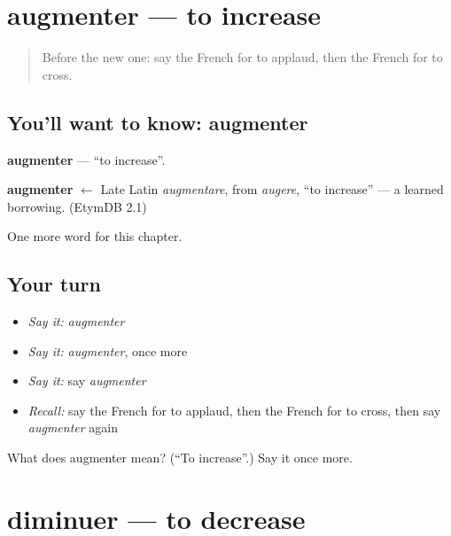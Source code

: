 \section[augmenter]{augmenter — to increase}

\label{lesson:FR-C208-augmenter}



\begin{quote}
Before the new one: say the French for to applaud, then the French for to cross.
\end{quote}

\subsection*{You'll want to know: augmenter}
\textbf{augmenter} — \textquotedblleft{}to increase\textquotedblright{}.

\begin{cousinweb}
\textbf{augmenter} $\leftarrow$ Late Latin \emph{augmentare}, from \emph{augere}, \textquotedblleft{}to increase\textquotedblright{} — a learned borrowing. (EtymDB 2.1)
\end{cousinweb}

\begin{grammarlens}[title={What you've built}]
One more word for this chapter.
\end{grammarlens}

\subsection*{Your turn}
\begin{itemize}
\raggedright
  \item \emph{Say it:} \emph{augmenter}
  \item \emph{Say it:} \emph{augmenter}, once more
  \item \emph{Say it:} say \emph{augmenter}
  \item \emph{Recall:} say the French for to applaud, then the French for to cross, then say \emph{augmenter} again
\end{itemize}

\begin{tcolorbox}[breakable,colback=teal!4,colframe=teal!35!black,title={Before you move on}]
What does augmenter mean? (\textquotedblleft{}To increase\textquotedblright{}.) Say it once more.
\end{tcolorbox}
\section[diminuer]{diminuer — to decrease}

